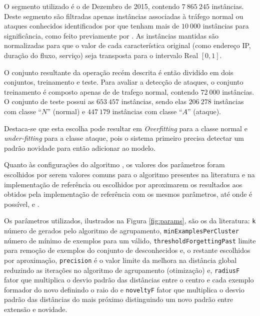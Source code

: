 O segmento utilizado é o de Dezembro de 2015, contendo $7\:865\:245$ instâncias.
Deste segmento são filtradas apenas instâncias associadas à tráfego normal ou
ataques conhecidos identificados por \nids que tenham mais de $10\:000$ instâncias
para significância, como feito previamente por .
As instâncias mantidas são normalizadas para que o valor de cada característica
original (como endereço IP, duração do fluxo, serviço) seja transposta para o
intervalo Real $[0, 1]$.

O conjunto resultante da operação recém descrita é então dividido em dois
conjuntos, treinamento e teste.
Para avaliar a detecção de ataques, o conjunto treinamento é composto apenas de
de trafego normal, contendo $72\:000$ instâncias.
O conjunto de teste possui as $653\:457$ instâncias, sendo elas
$206\:278$ instâncias com classe ``$N$'' (normal) e
$447\:179$ instâncias com classe ``$A$'' (ataque).

Destaca-se que esta escolha pode resultar em \emph{Overfitting} para a classe
normal e \emph{under-fitting} para a classe ataque, pois o sistema primeiro
precisa detectar um padrão novidade para então adicionar ao modelo.

Quanto às configurações do algoritmo \minas, os valores dos parâmetros foram
escolhidos por serem valores comuns para o algoritmo presentes na literatura
\cite{Faria2013Minas,Faria2016minas} e na implementação de referência 
\cite{Faria2013source} ou escolhidos por aproximarem os resultados aos obtidos
pela implementação de referência  com os mesmos parâmetros, até onde é
possível, e \dataset.

Os parâmetros utilizados, ilustrados na Figura \ref{fig:params}, são
os da literatura: \texttt{k} número de \mclusters gerados pelo algoritmo de agrupamento,
\texttt{minExamplesPerCluster} número de mínimo de exemplos para um \mcluster válido,
\texttt{thresholdForgettingPast} limite para remoção de exemplos do conjunto de
desconhecidos e, o restante escolhidos por aproximação,
\texttt{precision} é o valor limite da melhora na distância global reduzindo as 
iterações no algoritmo de agrupamento (otimização) e,
\texttt{radiusF} fator que multiplica o desvio padrão das distâncias entre o
centro e cada exemplo formador do novo \mcluster definindo o raio do \mcluster
e 
\texttt{noveltyF} fator que multiplica o desvio padrão das distâncias do
\mcluster mais próximo distinguindo um novo padrão entre extensão e novidade.


